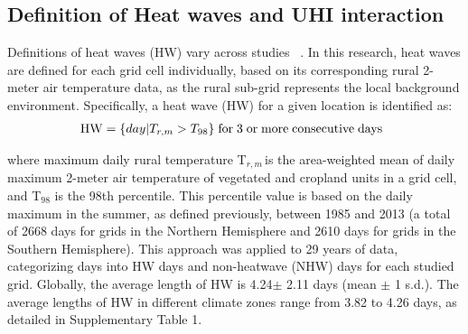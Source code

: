 \subsection*{Definition of Heat waves and UHI interaction}Definitions of heat waves (HW) vary across studies\unskip~\cite{2755510:33598930,2755510:33598927} . In this research, heat waves are defined for each grid cell individually, based on its corresponding rural 2-meter air temperature data, as the rural sub-grid represents the local background environment. Specifically, a heat wave (HW) for a given location is identified as:
\let\saveeqnno\theequation
\let\savefrac\frac
\def\dispfrac{\displaystyle\savefrac}
\begin{eqnarray}
    \let\frac\dispfrac
    \gdef\theequation{1}
    \let\theHequation\theequation
    \label{dfg-2755510:33598937}
    \begin{array}{@{}l}\style{font-family:'Times New Roman'}{\mathrm{HW}=\{day\vert T_{r,m}>T_{98}\}\;\mathrm{for}\;3\;\mathrm{or}\;\mathrm{more}\;\mathrm{consecutive}\;\mathrm{days}}\end{array}
\end{eqnarray}
\global\let\theequation\saveeqnno
\addtocounter{equation}{-1}\ignorespaces
where maximum daily rural temperature  T\ensuremath{_{r,m\ }}is the area-weighted mean of daily maximum 2-meter air temperature of vegetated and cropland units in a grid cell, and T\ensuremath{_{98}} is the 98th percentile. This percentile value is based on the daily maximum in the summer, as defined previously, between 1985 and 2013 (a total of 2668 days for grids in the Northern Hemisphere and 2610 days for grids in the Southern Hemisphere). This approach was applied to 29 years of data, categorizing days into HW days and non-heatwave (NHW) days for each studied grid. Globally, the average length of HW is 4.24\ensuremath{\pm} 2.11 days (mean \ensuremath{\pm} 1 s.d.). The average lengths of HW in different climate zones range from 3.82 to 4.26 days, as detailed in Supplementary Table 1.

